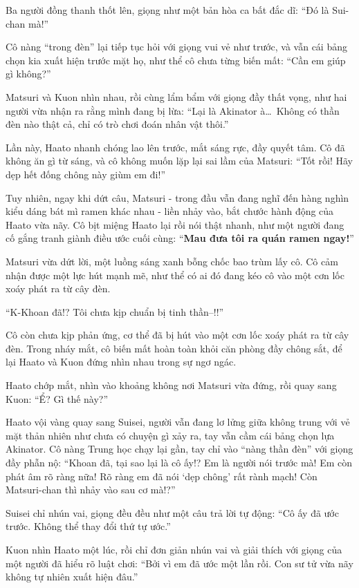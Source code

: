 \documentclass[../main.tex]{subfiles}
\begin{document}
Ba người đồng thanh thốt lên, giọng như một bản hòa ca bất đắc dĩ: ``Đó là Sui-chan mà!''

Cô nàng ``trong đèn'' lại tiếp tục hỏi với giọng vui vẻ như trước, và vẫn cái bảng chọn kia xuất hiện trước mặt họ, như thể cô chưa từng biến mất: ``Cần em giúp gì không?''

Matsuri và Kuon nhìn nhau, rồi cùng lẩm bẩm với giọng đầy thất vọng, như hai người vừa nhận ra rằng mình đang bị lừa: ``Lại là Akinator à\dots\ Không có thần đèn nào thật cả, chỉ có trò chơi đoán nhân vật thôi.''

Lần này, Haato nhanh chóng lao lên trước, mắt sáng rực, đầy quyết tâm. Cô đã không ăn gì từ sáng, và cô không muốn lặp lại sai lầm của Matsuri: ``Tốt rồi! Hãy dẹp hết đống chông này giùm em đi!''

Tuy nhiên, ngay khi dứt câu, Matsuri - trong đầu vẫn đang nghĩ đến hàng nghìn kiểu dáng bát mì ramen khác nhau - liền nhảy vào, bắt chước hành động của Haato vừa nãy. Cô bịt miệng Haato lại rồi nói thật nhanh, như một người đang cố gắng tranh giành điều ước cuối cùng: ``\textbf{Mau đưa tôi ra quán ramen ngay!}''

Matsuri vừa dứt lời, một luồng sáng xanh bỗng chốc bao trùm lấy cô. Cô cảm nhận được một lực hút mạnh mẽ, như thể có ai đó đang kéo cô vào một cơn lốc xoáy phát ra từ cây đèn.

``K-Khoan đã!? Tôi chưa kịp chuẩn bị tinh thần--!!''

Cô còn chưa kịp phản ứng, cơ thể đã bị hút vào một cơn lốc xoáy phát ra từ cây đèn. Trong nháy mắt, cô biến mất hoàn toàn khỏi căn phòng đầy chông sắt, để lại Haato và Kuon đứng nhìn nhau trong sự ngơ ngác.

Haato chớp mắt, nhìn vào khoảng không nơi Matsuri vừa đứng, rồi quay sang Kuon: ``Ể? Gì thế này?''

Haato vội vàng quay sang Suisei, người vẫn đang lơ lửng giữa không trung với vẻ mặt thản nhiên như chưa có chuyện gì xảy ra, tay vẫn cầm cái bảng chọn lựa Akinator. Cô nàng Trung học chạy lại gần, tay chỉ vào ``nàng thần đèn'' với giọng đầy phẫn nộ: ``Khoan đã, tại sao lại là cô ấy!? Em là người nói trước mà! Em còn phát âm rõ ràng nữa! Rõ ràng em đã nói `dẹp chông' rất rành mạch! Còn Matsuri-chan thì nhảy vào sau cơ mà!?''

Suisei chỉ nhún vai, giọng đều đều như một câu trả lời tự động: ``Cô ấy đã ước trước. Không thể thay đổi thứ tự ước.''

Kuon nhìn Haato một lúc, rồi chỉ đơn giản nhún vai và giải thích với giọng của một người đã hiểu rõ luật chơi: ``Bởi vì em đã ước một lần rồi. Con sư tử vừa nãy không tự nhiên xuất hiện đâu.''
\end{document}
